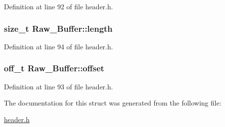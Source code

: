 Definition at line 92 of file header.h.\hypertarget{structRaw__Buffer_ae80c202031025e289957de56066bf5c7}{
\subsubsection[{length}]{\setlength{\rightskip}{0pt plus 5cm}size\_\-t {\bf Raw\_\-Buffer::length}}}
\label{structRaw__Buffer_ae80c202031025e289957de56066bf5c7}


Definition at line 94 of file header.h.\hypertarget{structRaw__Buffer_a75637fbc0758bd004fb0bc946b100488}{
\subsubsection[{offset}]{\setlength{\rightskip}{0pt plus 5cm}off\_\-t {\bf Raw\_\-Buffer::offset}}}
\label{structRaw__Buffer_a75637fbc0758bd004fb0bc946b100488}


Definition at line 93 of file header.h.

The documentation for this struct was generated from the following file:\begin{DoxyCompactItemize}
\item 
\hyperlink{header_8h}{header.h}\end{DoxyCompactItemize}
